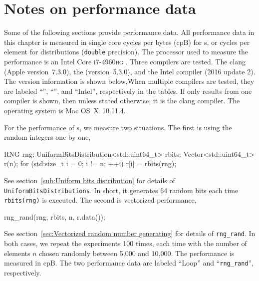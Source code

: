 \section{Notes on performance data}
\label{sec:Notes on performance data}

Some of the following sections provide performance data. All performance data
in this chapter is measured in single core cycles per bytes (cpB) for \rng{}s,
or cycles per element for distributions (\verb|double| precision). The
processor used to measure the performance is an Intel Core i7-4960\textsc{hg}
\cpu. Three compilers are tested. The \llvm clang (Apple version~7.3.0), the
\gnu{} \gcc (version~5.3.0), and the Intel \cpp compiler (2016 update 2). The
version information is shown below,When multiple compilers are tested, they are
labeled ``\llvm'', ``\gnu'', and ``Intel'', respectively in the tables. If only
results from one compiler is shown, then unless stated otherwise, it is the
\llvm clang compiler. The operating system is Mac OS~X~10.11.4.

For the performance of \rng{}s, we measure two situations. The first is
using the random integers one by one,
\begin{cppcode}
  RNG rng;
  UniformBitsDistribution<std::uint64_t> rbits;
  Vector<std::uint64_t> r(n);
  for (std:size_t i = 0; i != n; ++i)
      r[i] = rbits(rng);
\end{cppcode}
See section~\ref{sub:Uniform bits distribution} for details of
\verb|UniformBitsDistributions|. In short, it generates 64 random bits each
time \verb|rbits(rng)| is executed. The second is vectorized performance,
\begin{cppcode}
  rng_rand(rng, rbits, n, r.data());
\end{cppcode}
See section~\ref{sec:Vectorized random number generating} for details of
\verb|rng_rand|. In both cases, we repeat the experiments 100 times, each time
with the number of elements $n$ chosen randomly between 5,000 and 10,000. The
performance is measured in cpB. The two performance data are labeled ``Loop''
and ``\verb|rng_rand|'', respectively.

